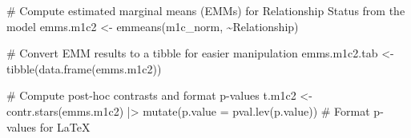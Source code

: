 \documentclass[
  bookmarksnumbered]{article}
\newenvironment{Shaded}{\begin{snugshade}}{\end{snugshade}}
\newcommand{\AttributeTok}[1]{\textcolor[rgb]{0.80,0.80,0.80}{#1}}
\newcommand{\CommentTok}[1]{\textcolor[rgb]{0.50,0.62,0.50}{#1}}
\newcommand{\FunctionTok}[1]{\textcolor[rgb]{0.94,0.94,0.56}{#1}}
\newcommand{\NormalTok}[1]{\textcolor[rgb]{0.80,0.80,0.80}{#1}}
\newcommand{\OtherTok}[1]{\textcolor[rgb]{0.94,0.94,0.56}{#1}}
\newcommand{\SpecialCharTok}[1]{\textcolor[rgb]{0.86,0.64,0.64}{#1}}
\begin{document}
\begin{Shaded}
\begin{Highlighting}[]
\CommentTok{\# Compute estimated marginal means (EMMs) for Relationship Status from the model}
\NormalTok{emms.m1c2 }\OtherTok{\textless{}{-}} \FunctionTok{emmeans}\NormalTok{(m1c\_norm, }\SpecialCharTok{\textasciitilde{}}\NormalTok{Relationship)}

\CommentTok{\# Convert EMM results to a tibble for easier manipulation}
\NormalTok{emms.m1c2.tab }\OtherTok{\textless{}{-}} \FunctionTok{tibble}\NormalTok{(}\FunctionTok{data.frame}\NormalTok{(emms.m1c2))}

\CommentTok{\# Compute post{-}hoc contrasts and format p{-}values}
\NormalTok{t.m1c2 }\OtherTok{\textless{}{-}} \FunctionTok{contr.stars}\NormalTok{(emms.m1c2) }\SpecialCharTok{|\textgreater{}}
  \FunctionTok{mutate}\NormalTok{(}\AttributeTok{p.value =} \FunctionTok{pval.lev}\NormalTok{(p.value)) }\CommentTok{\# Format p{-}values for LaTeX}


\end{Highlighting}
\end{Shaded}
\end{document}
